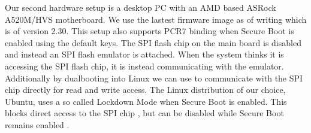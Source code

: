 Our second hardware setup is a desktop \ac{PC} with an \ac{AMD} based ASRock A520M\-/HVS motherboard.
We use the lastest firmware image as of writing which is of version 2.30.
This setup also supports \ac{PCR}7 binding when Secure Boot is enabled using the default keys.
The \ac{SPI} flash chip on the main board is disabled and instead an  \ac{SPI} flash emulator is attached.
When the system thinks it is accessing the \ac{SPI} flash chip, it is instead communicating with the emulator.
Additionally by dualbooting into Linux we can use  to communicate with the \ac{SPI} chip directly for read and write access.
The Linux distribution of our choice, Ubuntu, uses a so called Lockdown Mode when Secure Boot is enabled.
This blocks direct access to the \ac{SPI} chip \cite{man-kernel-lockdown}, but can be disabled while Secure Boot remains enabled \cite{disable-kernel-lockdown}.
